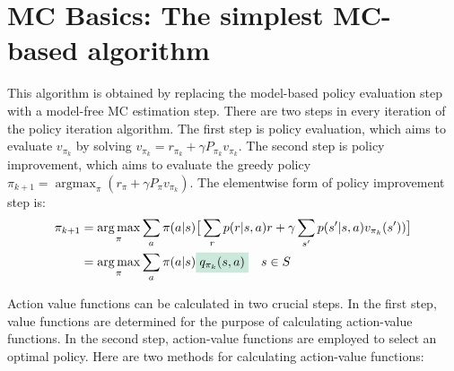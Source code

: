\section{MC Basics: The simplest MC-based algorithm}
This algorithm is obtained by replacing the model-based policy evaluation step with a model-free MC estimation step. There are two steps in
every iteration of the policy iteration algorithm. The first step is policy evaluation, which aims to evaluate $v_{\pi_{k}}$ by solving
$v_{\pi_{k}}=r_{\pi_{k}}+\gamma P_{\pi_{k}}v_{\pi_{k}}$. The second step is policy improvement, which aims to evaluate the greedy policy
$\pi_{k+1} = \mathop{\arg \max}_{\pi}(r_{\pi}+\gamma P_{\pi}v_{\pi_{k}})$. The elementwise form of policy improvement step is:
\begin{align*}
	\pi_{k+1} & = \mathop{\arg \max}_{\pi} \sum_{a} \pi(a|s)\big[ \sum_{r}p(r|s,a)r + \gamma \sum_{s'}p(s'|s,a)v_{\pi_{k}}(s')) \big] \\
	          & = \mathop{\arg \max}_{\pi}\sum_{a} \pi(a|s) \colorbox{mygreen!20!white}{$q_{\pi_{k}}(s,a)$} \quad  s \in S
\end{align*}

Action value functions can be calculated in two crucial steps. In the first step, value functions are determined for the purpose of calculating
action-value functions. In the second step, action-value functions are employed to select an optimal policy. Here are two methods for
calculating action-value functions:

